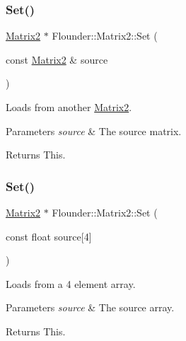 \subsubsection{\texorpdfstring{Set()}{Set()}\hspace{0.1cm}{\footnotesize\ttfamily [1/2]}}
{\footnotesize\ttfamily \hyperlink{class_flounder_1_1_matrix2}{Matrix2} $\ast$ Flounder\+::\+Matrix2\+::\+Set (\begin{DoxyParamCaption}\item[{const \hyperlink{class_flounder_1_1_matrix2}{Matrix2} \&}]{source }\end{DoxyParamCaption})}



Loads from another \hyperlink{class_flounder_1_1_matrix2}{Matrix2}. 


\begin{DoxyParams}{Parameters}
{\em source} & The source matrix. \\
\hline
\end{DoxyParams}
\begin{DoxyReturn}{Returns}
This. 
\end{DoxyReturn}
\mbox{\label{class_flounder_1_1_matrix2_ab7eb0b3da02f9522314d39927091c05a}} 
\subsubsection{\texorpdfstring{Set()}{Set()}\hspace{0.1cm}{\footnotesize\ttfamily [2/2]}}
{\footnotesize\ttfamily \hyperlink{class_flounder_1_1_matrix2}{Matrix2} $\ast$ Flounder\+::\+Matrix2\+::\+Set (\begin{DoxyParamCaption}\item[{const float}]{source\mbox{[}4\mbox{]} }\end{DoxyParamCaption})}



Loads from a 4 element array. 


\begin{DoxyParams}{Parameters}
{\em source} & The source array. \\
\hline
\end{DoxyParams}
\begin{DoxyReturn}{Returns}
This. 
\end{DoxyReturn}
\mbox{\label{class_flounder_1_1_matrix2_a4033d2130af3941798f2d3c1a17fd26c}} 
